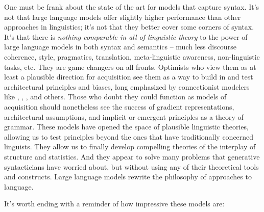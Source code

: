 \documentclass[output=paper,colorlinks,citecolor=brown
]{langscibook}
\begin{document}
One must be frank about the state of the art for models that capture syntax. It's not that large language models offer slightly higher performance than other approaches in linguistics; it's not that they better cover some corners of syntax. It's that there is \textit{nothing comparable in all of linguistic theory} to the power of large language models in both syntax and semantics -- much less discourse coherence, style, pragmatics, translation, meta-linguistic awareness, non-linguistic tasks, etc. They are game changers on all fronts. Optimists who view them as at least a plausible direction for acquisition see them as a way to build in and test architectural principles and biases, long emphasized by connectionist modelers like \citet{mcclelland1986parallel}, \citet{elman1996rethinking}, \citet{smolensky2006harmonic}, and others. Those who doubt they could function as models of acquisition should nonetheless see the success of gradient representations, architectural assumptions, and implicit or emergent principles as a theory of grammar. These models have opened the space of plausible linguistic theories, allowing us to test principles beyond the ones that have traditionally concerned linguists. They allow us to finally develop compelling theories of the interplay of structure and statistics. And they appear to solve many problems that generative syntacticians have worried about, but without using any of their theoretical tools and constructs. Large language models rewrite the philosophy of approaches to language. 

It's worth ending with a reminder of how impressive these models are:



\end{document}
